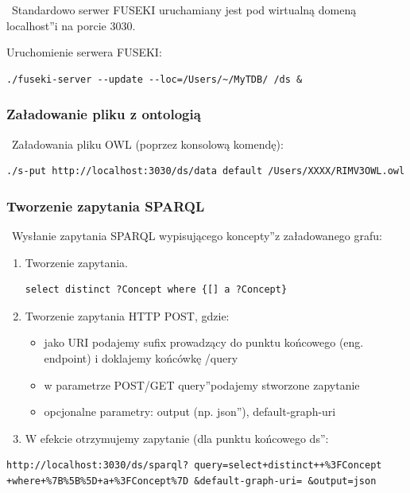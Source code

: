 ~Standardowo serwer FUSEKI uruchamiany jest pod wirtualną domeną \quotedblbase localhost\textquotedblright i na porcie 3030.

Uruchomienie serwera FUSEKI:
\begin{lstlisting}
./fuseki-server --update --loc=/Users/~/MyTDB/ /ds &
\end{lstlisting}

\subsubsection{Załadowanie pliku z ontologią}

~Załadowania pliku OWL (poprzez konsolową komendę):

\begin{lstlisting}
./s-put http://localhost:3030/ds/data default /Users/XXXX/RIMV3OWL.owl
\end{lstlisting}

\subsubsection{Tworzenie zapytania SPARQL}

~Wysłanie zapytania SPARQL wypisującego \quotedblbase koncepty\textquotedblright z załadowanego grafu:

\begin{enumerate}
\item Tworzenie zapytania.
\begin{lstlisting}
select distinct ?Concept where {[] a ?Concept}
\end{lstlisting}
\item Tworzenie zapytania HTTP POST, gdzie:
\begin{itemize}
\item jako URI podajemy sufix prowadzący do punktu końcowego (eng. endpoint) i doklajemy końcówkę /query
\item w parametrze POST/GET \quotedblbase query\textquotedblright podajemy stworzone zapytanie 
\item opcjonalne parametry: output (np. \quotedblbase json\textquotedblright ), default-graph-uri
\end{itemize}
\item W efekcie otrzymujemy zapytanie (dla punktu końcowego \quotedblbase ds\textquotedblright :
\end{enumerate}

\begin{lstlisting}
http://localhost:3030/ds/sparql? query=select+distinct++%3FConcept +where+%7B%5B%5D+a+%3FConcept%7D &default-graph-uri= &output=json
\end{lstlisting}

